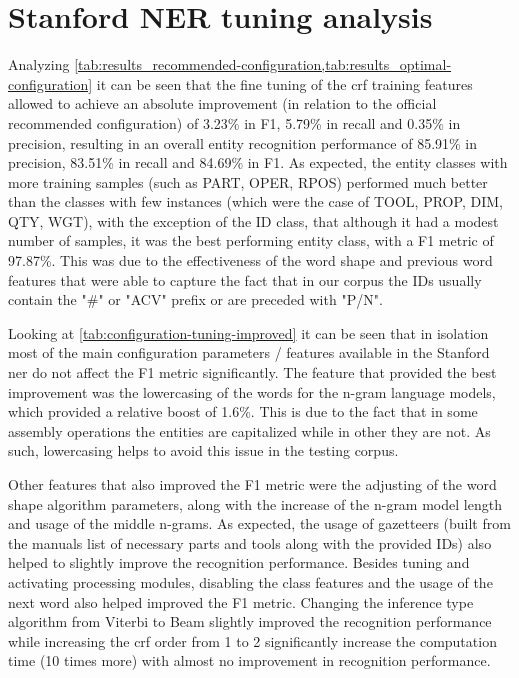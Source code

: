 \section{Stanford NER tuning analysis}\label{sec:model-tuning-results}

Analyzing \cref{tab:results_recommended-configuration,tab:results_optimal-configuration} it can be seen that the fine tuning of the \gls{crf} training features allowed to achieve an absolute improvement (in relation to the official recommended configuration) of 3.23\% in F1, 5.79\% in recall and 0.35\% in precision, resulting in an overall entity recognition performance of 85.91\% in precision, 83.51\% in recall and 84.69\% in F1. As expected, the entity classes with more training samples (such as PART, OPER, RPOS) performed much better than the classes with few instances (which were the case of TOOL, PROP, DIM, QTY, WGT), with the exception of the ID class, that although it had a modest number of samples, it was the best performing entity class, with a F1 metric of 97.87\%. This was due to the effectiveness of the word shape and previous word features that were able to capture the fact that in our corpus the IDs usually contain the "\#" or "ACV" prefix or are preceded with "P/N".

Looking at \cref{tab:configuration-tuning-improved} it can be seen that in isolation most of the main configuration parameters / features available in the Stanford \gls{ner} do not affect the F1 metric significantly. The feature that provided the best improvement was the lowercasing of the words for the n-gram language models, which provided a relative boost of 1.6\%. This is due to the fact that in some assembly operations the entities are capitalized while in other they are not. As such, lowercasing helps to avoid this issue in the testing corpus.

Other features that also improved the F1 metric were the adjusting of the word shape algorithm parameters, along with the increase of the n-gram model length and usage of the middle n-grams. As expected, the usage of gazetteers (built from the manuals list of necessary parts and tools along with the provided IDs) also helped to slightly improve the recognition performance. Besides tuning and activating processing modules, disabling the class features and the usage of the next word also helped improved the F1 metric. Changing the inference type algorithm from Viterbi to Beam slightly improved the recognition performance while increasing the \gls{crf} order from 1 to 2 significantly increase the computation time (10 times more) with almost no improvement in recognition performance.

